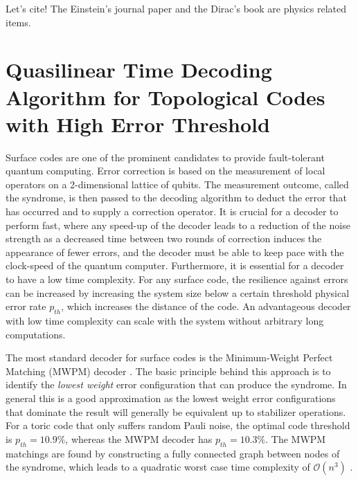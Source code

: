 \documentclass[11pt, a4paper, twoside, titlepage, usenames,dvipsnames]{report}
\begin{document}
Let's cite! The Einstein's journal paper \cite{einstein} and the Dirac's
book \cite{dirac} are physics related items.


\section*{Quasilinear Time Decoding Algorithm for Topological Codes with High Error Threshold}

Surface codes \cite{dennis2002topological, kitaev2003fault} are one of the prominent candidates to provide fault-tolerant quantum computing. Error correction is based on the measurement of local operators on a 2-dimensional lattice of qubits. The measurement outcome, called the syndrome, is then passed to the decoding algorithm to deduct the error that has occurred and to supply a correction operator. It is crucial for a decoder to perform fast, where any speed-up of the decoder leads to a reduction of the noise strength as a decreased time between two rounds of correction induces the appearance of fewer errors, and the decoder must be able to keep pace with the clock-speed of the quantum computer. Furthermore, it is essential for a decoder to have a low time complexity. For any surface code, the resilience against errors can be increased by increasing the system size below a certain threshold physical error rate $p_{th}$, which increases the distance of the code. An advantageous decoder with low time complexity can scale with the system without arbitrary long computations.

The most standard decoder for surface codes is the Minimum-Weight Perfect Matching (MWPM) decoder \cite{dennis2002topological}. The basic principle behind this approach is to identify the \emph{lowest weight} error configuration that can produce the syndrome. In general this is a good approximation as the lowest weight error configurations that dominate the result will generally be equivalent up to stabilizer operations. For a toric code that only suffers random Pauli noise, the optimal code threshold is $p_{th} = 10.9\%$, whereas the MWPM decoder has $p_{th} = 10.3\%$. The MWPM matchings are found by constructing a fully connected graph between nodes of the syndrome, which leads to a quadratic worst case time complexity of $\mathcal{O}(n^3)$ \cite{kolmogorov2009blossom}.
\end{document}
